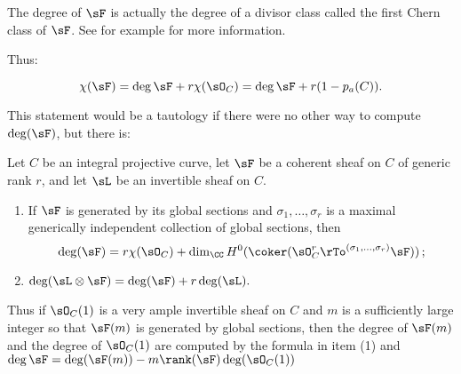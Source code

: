 \begin{fact}
The degree of $\sF$ is actually the degree of a divisor class called the first Chern class of $\sF$. See
for example \cite[Chapter ***]{3264}
for more information. 
\end{fact}

Thus:
\begin{theorem}\label{general RR without duality}
$$
 \chi(\sF) = \deg \sF + r\chi(\sO_C) = \deg \sF + r(1-p_a(C)).
 $$
\end{theorem}
 
This statement would be
a tautology if there were no other way to compute $\deg(\sF)$, but there is:

\begin{lemma} Let $C$ be an integral projective curve, let $\sF$ be a coherent sheaf on $C$ of generic rank $r$, and let $\sL$ be an invertible sheaf on $C$.
\begin{enumerate}
\item If $\sF$ is generated by its global sections and $\sigma_1,\dots, \sigma_r$ is a maximal generically independent
collection of global sections,  then 
$$
\deg (\sF) = r \chi(\sO_C)+
\dim_\CC H^0(\coker(\sO_C^r \rTo^{(\sigma_1,\dots, \sigma_r)}\sF))\,;
$$

\item $\deg (\sL \otimes \sF) = \deg (\sF) +r\deg (\sL).$

\end{enumerate}
Thus if $\sO_C(1)$ is a very ample invertible sheaf on $C$ and $m$ is a sufficiently large integer so that
$\sF(m)$ is generated by global sections, then the degree of $\sF(m)$ and the degree of $\sO_C(1)$ are computed by the formula in item (1)
and $\deg \sF = \deg(\sF(m)) - m \rank(\sF) \deg (\sO_C(1))$
\end{lemma}

